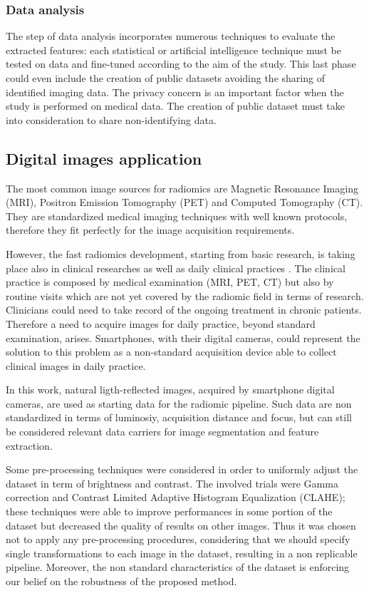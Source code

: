 \documentclass[../main.tex]{subfiles}
\begin{document}
\subsubsection{Data analysis}

The step of data analysis incorporates numerous techniques to evaluate the extracted features: each statistical or artificial intelligence technique must be tested on data and fine-tuned according to the aim of the study.
This last phase could even include the creation of public datasets avoiding the sharing of identified imaging data. 
The privacy concern is an important factor when the study is performed on medical data.
The creation of public dataset must take into consideration to share non-identifying data.


\subsection{Digital images application}

The most common image sources for radiomics are Magnetic Resonance Imaging (MRI), Positron Emission Tomography (PET) and  Computed Tomography (CT). 
They are standardized medical imaging techniques with well known protocols, therefore they fit perfectly for the image acquisition requirements.

However, the fast radiomics development, starting from basic research, is taking place also in clinical researches as well as daily clinical practices \cite{gillies2016radiomics-more-than-images}. 
The clinical practice is composed by medical examination (MRI, PET, CT) but also by routine visits which are not yet covered by the radiomic field in terms of research.
Clinicians could need to take record of the ongoing treatment in chronic patients.
Therefore a need to acquire images for daily practice, beyond standard examination, arises.
Smartphones, with their digital cameras, could represent the solution to this problem as a non-standard acquisition device able to collect clinical images in daily practice.

In this work, natural ligth-reflected images, acquired by smartphone digital cameras, are used as starting data for the radiomic pipeline. Such data are non standardized in terms of luminosiy, acquisition distance and focus, but can still be considered relevant data carriers for image segmentation and feature extraction.

Some pre-processing techniques were considered in order to uniformly adjust the dataset in term of brightness and contrast.
The involved trials  were Gamma correction and Contrast Limited Adaptive Histogram Equalization (CLAHE); these techniques were able to improve performances in some portion of the dataset but decreased the quality of  results on other images.
Thus it was chosen not to apply any pre-processing procedures, considering that we should specify single transformations to each image in the dataset, resulting in a non replicable pipeline.
Moreover, the non standard characteristics of the dataset is enforcing our belief on the robustness of the proposed method.
\end{document}
